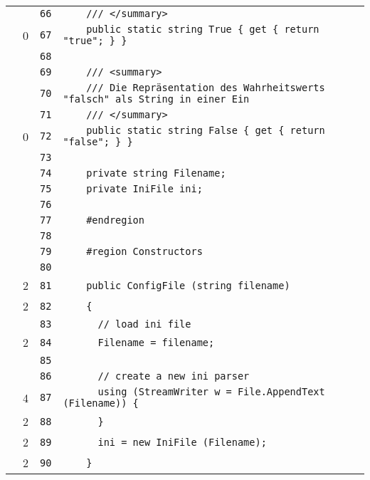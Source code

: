 \documentclass[a4paper,10pt]{article}
\begin{document}
\begin{longtable}[l]{lrrl}
\cellcolor{gray} &  & \verb~66~ & \verb~    /// </summary>~\\
\cellcolor{red} & 0 & \verb~67~ & \verb~    public static string True { get { return "true"; } }~\\
\cellcolor{gray} &  & \verb~68~ & \verb~~\\
\cellcolor{gray} &  & \verb~69~ & \verb~    /// <summary>~\\
\cellcolor{gray} &  & \verb~70~ & \verb~    /// Die Repräsentation des Wahrheitswerts "falsch" als String in einer Ein~\\
\cellcolor{gray} &  & \verb~71~ & \verb~    /// </summary>~\\
\cellcolor{red} & 0 & \verb~72~ & \verb~    public static string False { get { return "false"; } }~\\
\cellcolor{gray} &  & \verb~73~ & \verb~~\\
\cellcolor{gray} &  & \verb~74~ & \verb~    private string Filename;~\\
\cellcolor{gray} &  & \verb~75~ & \verb~    private IniFile ini;~\\
\cellcolor{gray} &  & \verb~76~ & \verb~~\\
\cellcolor{gray} &  & \verb~77~ & \verb~    #endregion~\\
\cellcolor{gray} &  & \verb~78~ & \verb~~\\
\cellcolor{gray} &  & \verb~79~ & \verb~    #region Constructors~\\
\cellcolor{gray} &  & \verb~80~ & \verb~~\\
\cellcolor{green} & 2 & \verb~81~ & \verb~    public ConfigFile (string filename)~\\
\cellcolor{green} & 2 & \verb~82~ & \verb~    {~\\
\cellcolor{gray} &  & \verb~83~ & \verb~      // load ini file~\\
\cellcolor{green} & 2 & \verb~84~ & \verb~      Filename = filename;~\\
\cellcolor{gray} &  & \verb~85~ & \verb~~\\
\cellcolor{gray} &  & \verb~86~ & \verb~      // create a new ini parser~\\
\cellcolor{green} & 4 & \verb~87~ & \verb~      using (StreamWriter w = File.AppendText (Filename)) {~\\
\cellcolor{green} & 2 & \verb~88~ & \verb~      }~\\
\cellcolor{green} & 2 & \verb~89~ & \verb~      ini = new IniFile (Filename);~\\
\cellcolor{green} & 2 & \verb~90~ & \verb~    }~\\

\end{longtable}
\end{document}
